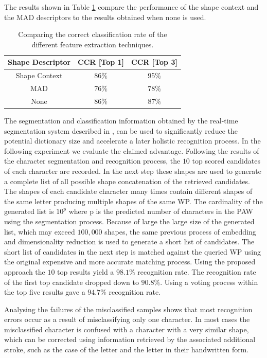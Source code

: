 \documentclass[10pt, conference, compsocconf]{IEEEtran}
\begin{document}
The results shown in Table \ref{table:features_comparison} compare the performance of the shape context and the MAD descriptors to the results obtained when none is used.

\begin{table}
\centering
\begin{tabular}{ | c | c | c |}
\hline
	Shape Descriptor  & CCR [Top 1]  & CCR [Top 3] \\
	\hline 
	Shape Context & 86\% & 95\%  \\                
  	\hline
  	MAD & 76\% & 78\% \\
  	\hline
  	None & 86\% &  87\% \\
  	\hline
\end{tabular}
\caption{Comparing the correct classification rate of the different feature extraction techniques.}
\label{table:features_comparison} 
\end{table}

The segmentation and classification information obtained by the real-time segmentation system described in \cite{kour2014real}, can be used to significantly reduce the potential dictionary size and accelerate a later holistic recognition process.
In the following experiment we evaluate the claimed advantage.
Following the results of the character segmentation and recognition process, the $10$ top scored candidates of each character are recorded. 
In the next step these shapes are used to generate a complete list of all possible shape concatenation of the retrieved candidates. 
The shapes of each candidate character many times contain different shapes of the same letter producing multiple shapes of the same WP. 
The cardinality of the generated list is $10^p$ where p is the predicted number of characters in the PAW using the segmentation process. 
Because of large the large size of the generated list, which may exceed $100,000$ shapes, the same previous process of embedding and dimensionality reduction is used to generate a short list of candidates. 
The short list of candidates in the next step is matched against the queried WP using the original expensive and more accurate matching process. 
Using the proposed approach the $10$ top results yield a $98.1\%$ recognition rate. 
The recognition rate of the first top candidate dropped down to $90.8\%$. 
Using a voting process within the top five results gave a $94.7\%$ recognition rate. 

Analysing the failures of the misclassified samples shows that most recognition errors occur as a result of misclassifying only one character. 
In most cases the misclassified character is confused with a character with a very similar shape, which can be corrected using information retrieved by the associated additional stroke, such as the case of the letter  and the letter  in their handwritten form.
\end{document}
